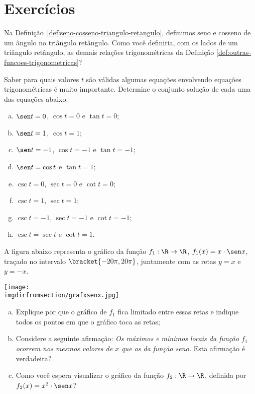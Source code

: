 \section{Exercícios}

\begin{exercise}
    Na Definição~\ref{def:seno-cosseno-triangulo-retangulo}, definimos seno e cosseno de um ângulo no
triângulo retângulo. Como você definiria, com os lados de um
triângulo retângulo, as demais relações trigonométricas da Definição
\ref{def:outras-funcoes-trigonometricas}?
\end{exercise}

\begin{exercise}
Saber para quais valores $t$ são válidas algumas equações
envolvendo equações trigonométricas é muito importante. Determine o
conjunto solução de cada uma das equações abaixo:
\begin{enumerate}[(a)]
  \item $\sen t = 0$, $\cos t = 0$ e $\tan t = 0$;
  \item $\sen t = 1$, $\cos t = 1$;
  \item $\sen t = -1$, $\cos t = -1$ e $\tan t = -1$;
  \item $\sen t = \cos t$ e $\tan t = 1$;
  \item $\csc t = 0$, $\sec t = 0$ e $\cot t = 0$;
  \item $\csc t = 1$, $\sec t = 1$;
  \item $\csc t = -1$, $\sec t = -1$ e $\cot t = -1$;
  \item $\csc t = \sec t$ e $\cot t = 1$.
\end{enumerate}
\end{exercise}

\begin{exercise}
    A figura abaixo representa o gráfico da função $f_1 : \R \to
\R$, $f_1(x) = x \cdot \sen x$, traçado no intervalo $\bracket{-20 \pi,
20 \pi}$, juntamente com as retas $y=x$ e $y=-x$.
\begin{center}
\texttt{[image: \\imgdirfromsection/grafxsenx.jpg]}
\end{center}
\begin{enumerate}[(a)]
  \item Explique por que o gráfico de $f_1$ fica limitado entre
  essas retas e indique todos os pontos em que o gráfico toca as retas;
  \item Considere a seguinte afirmação: \emph{Os máximos e
  mínimos locais da função $f_1$ ocorrem nos mesmos valores
  de $x$ que os da função seno.} Esta afirmação é verdadeira?
  \item Como você espera visualizar o gráfico da função $f_2: \R \to
  \R$, definida por $f_2(x) = x^2 \cdot \sen x$?
\end{enumerate}
\end{exercise}


